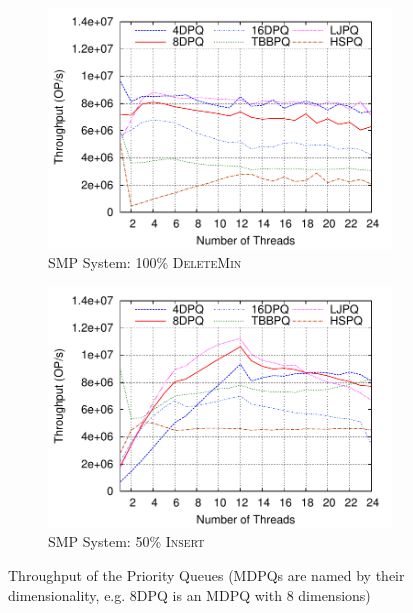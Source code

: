\documentclass[10pt,journal,letter,compsoc]{IEEEtran}
\begin{document}
\begin{figure}[t]
\begin{subfigure}{0.33\textwidth}
        \includegraphics[width=1\columnwidth]{./data/intel0insertion.pdf}
        \caption{SMP System: 100\% \textsc{DeleteMin}}
        \label{fig:0insintel}
    \end{subfigure}
    \hfill
    \begin{subfigure}{0.33\textwidth}
        \centering
        \includegraphics[width=1\columnwidth]{./data/intel50insertion.pdf}
        \caption{SMP System: 50\% \textsc{Insert}}
        \label{fig:50insintel}
    \end{subfigure}
    \caption{Throughput of the Priority Queues (MDPQs are named by their dimensionality, e.g. 8DPQ is an MDPQ with 8 dimensions)}
    \label{fig:throughput}
    \vspace{-0.2in}
\end{figure}
\end{document}
